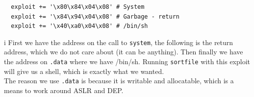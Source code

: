 \documentclass[a4paper]{article}
\begin{document}
\begin{verbatim}
  exploit += '\x80\x84\x04\x08' # System
  exploit += '\x84\x94\x04\x08' # Garbage - return
  exploit += '\x40\xa0\x04\x08' # /bin/sh
\end{verbatim}i
First we have the address on the call to \texttt{system}, the following is the return address, which we do not care about (it can be anything). Then finally we have the address on \texttt{.data} where we have /bin/sh. Running \texttt{sortfile} with this exploit will give us a shell, which is exactly what we wanted. \\
The reason we use \texttt{.data} is because it is writable and allocatable, which is a means to work around ASLR and DEP.
\end{document}
